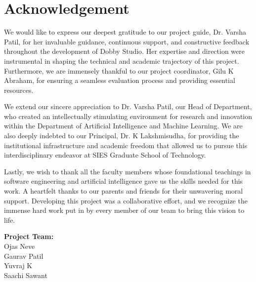\chapter*{Acknowledgement}

We would like to express our deepest gratitude to our project guide, Dr. Varsha Patil, for her invaluable guidance, continuous support, and constructive feedback throughout the development of Dobby Studio. Her expertise and direction were instrumental in shaping the technical and academic trajectory of this project. Furthermore, we are immensely thankful to our project coordinator, Gilu K Abraham, for ensuring a seamless evaluation process and providing essential resources.

We extend our sincere appreciation to Dr. Varsha Patil, our Head of Department, who created an intellectually stimulating environment for research and innovation within the Department of Artificial Intelligence and Machine Learning. We are also deeply indebted to our Principal, Dr. K Lakshmisudha, for providing the institutional infrastructure and academic freedom that allowed us to pursue this interdisciplinary endeavor at SIES Graduate School of Technology.

Lastly, we wish to thank all the faculty members whose foundational teachings in software engineering and artificial intelligence gave us the skills needed for this work. A heartfelt thanks to our parents and friends for their unwavering moral support. Developing this project was a collaborative effort, and we recognize the immense hard work put in by every member of our team to bring this vision to life.

\vspace{2cm}

\begin{flushright}
\textbf{Project Team:}\\
Ojas Neve\\
Gaurav Patil\\
Yuvraj K\\
Saachi Sawant
\end{flushright}

